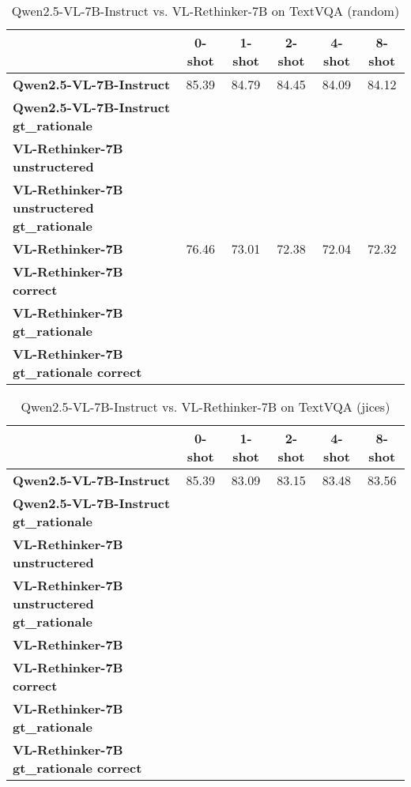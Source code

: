 \begin{table}
\caption{Qwen2.5-VL-7B-Instruct vs. VL-Rethinker-7B on TextVQA (random)}
\label{tab:Qwen2.5-VL-7B-Instruct_TextVQA_TRAIN_random}
\begin{tabular}{lccccc}
\toprule
 & 0-shot & 1-shot & 2-shot & 4-shot & 8-shot \\
\midrule
\textbf{Qwen2.5-VL-7B-Instruct} & 85.39 & 84.79 & 84.45 & 84.09 & 84.12 \\
\textbf{Qwen2.5-VL-7B-Instruct gt\_rationale} &  &  &  &  &  \\
\textbf{VL-Rethinker-7B unstructered} &  &  &  &  &  \\
\textbf{VL-Rethinker-7B unstructered gt\_rationale} &  &  &  &  &  \\
\textbf{VL-Rethinker-7B} & 76.46 & 73.01 & 72.38 & 72.04 & 72.32 \\
\textbf{VL-Rethinker-7B correct} &  &  &  &  &  \\
\textbf{VL-Rethinker-7B gt\_rationale} &  &  &  &  &  \\
\textbf{VL-Rethinker-7B gt\_rationale correct} &  &  &  &  &  \\
\bottomrule
\end{tabular}
\end{table}


\begin{table}
\caption{Qwen2.5-VL-7B-Instruct vs. VL-Rethinker-7B on TextVQA (jices)}
\label{tab:Qwen2.5-VL-7B-Instruct_TextVQA_TRAIN_jices}
\begin{tabular}{lccccc}
\toprule
 & 0-shot & 1-shot & 2-shot & 4-shot & 8-shot \\
\midrule
\textbf{Qwen2.5-VL-7B-Instruct} & 85.39 & 83.09 & 83.15 & 83.48 & 83.56 \\
\textbf{Qwen2.5-VL-7B-Instruct gt\_rationale} &  &  &  &  &  \\
\textbf{VL-Rethinker-7B unstructered} &  &  &  &  &  \\
\textbf{VL-Rethinker-7B unstructered gt\_rationale} &  &  &  &  &  \\
\textbf{VL-Rethinker-7B} &  &  &  &  &  \\
\textbf{VL-Rethinker-7B correct} &  &  &  &  &  \\
\textbf{VL-Rethinker-7B gt\_rationale} &  &  &  &  &  \\
\textbf{VL-Rethinker-7B gt\_rationale correct} &  &  &  &  &  \\
\bottomrule
\end{tabular}
\end{table}


